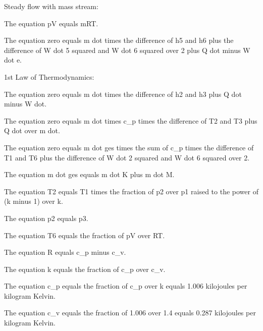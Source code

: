 Steady flow with mass stream:

The equation pV equals mRT.

The equation zero equals m dot times the difference of h5 and h6 plus the difference of W dot 5 squared and W dot 6 squared over 2 plus Q dot minus W dot e.

1st Law of Thermodynamics:

The equation zero equals m dot times the difference of h2 and h3 plus Q dot minus W dot.

The equation zero equals m dot times c_p times the difference of T2 and T3 plus Q dot over m dot.

The equation zero equals m dot ges times the sum of c_p times the difference of T1 and T6 plus the difference of W dot 2 squared and W dot 6 squared over 2.

The equation m dot ges equals m dot K plus m dot M.

The equation T2 equals T1 times the fraction of p2 over p1 raised to the power of (k minus 1) over k.

The equation p2 equals p3.

The equation T6 equals the fraction of pV over RT.

The equation R equals c_p minus c_v.

The equation k equals the fraction of c_p over c_v.

The equation c_p equals the fraction of c_p over k equals 1.006 kilojoules per kilogram Kelvin.

The equation c_v equals the fraction of 1.006 over 1.4 equals 0.287 kilojoules per kilogram Kelvin.